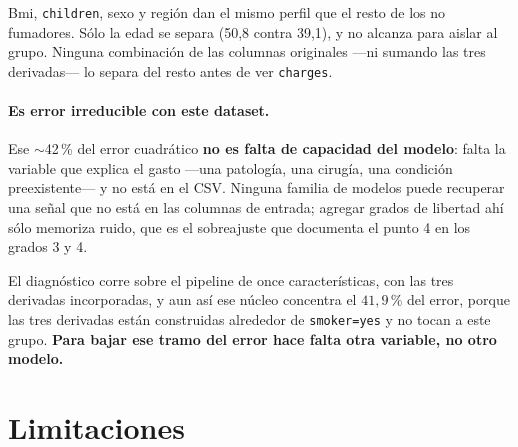 \documentclass[11pt,a4paper]{article}
\newcommand{\destacado}[1]{\textcolor{azulserie}{\textbf{#1}}}
\begin{document}
Bmi, \texttt{children}, sexo y región dan el mismo perfil que el resto de los no fumadores.
Sólo la edad se separa (50,8 contra 39,1), y no alcanza para aislar al grupo. Ninguna
combinación de las columnas originales ---ni sumando las tres derivadas--- lo separa del resto
antes de ver \texttt{charges}.

\paragraph{Es error irreducible con este dataset.} Ese $\sim$42\,\% del error cuadrático
\textbf{no es falta de capacidad del modelo}: falta la variable que explica el gasto ---una
patología, una cirugía, una condición preexistente--- y no está en el CSV. Ninguna familia de
modelos puede recuperar una señal que no está en las columnas de entrada; agregar grados de
libertad ahí sólo memoriza ruido, que es el sobreajuste que documenta el punto 4 en los grados
3 y 4.

El diagnóstico corre sobre el pipeline de once características, con las tres derivadas
incorporadas, y aun así ese núcleo concentra el $41{,}9$\,\% del error, porque las tres
derivadas están construidas alrededor de \texttt{smoker=yes} y no tocan a este grupo.
\destacado{Para bajar ese tramo del error hace falta otra variable, no otro modelo.}

\section{Limitaciones}
\end{document}
